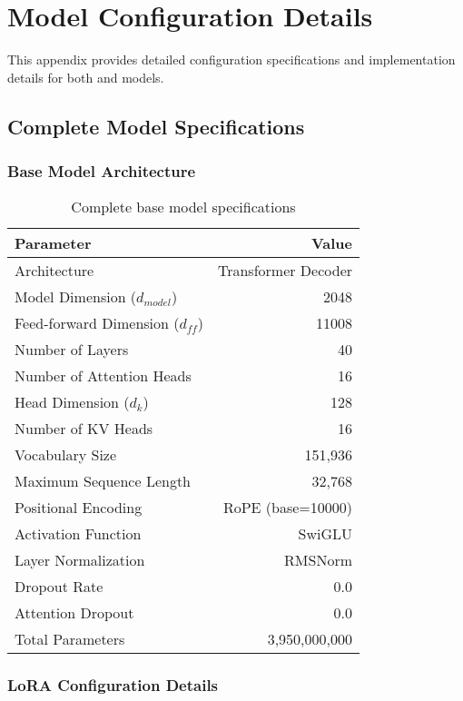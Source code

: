 \section{Model Configuration Details}
\label{appendix:config}

This appendix provides detailed configuration specifications and implementation details for both \supra{} and \zennano{} models.

\subsection{Complete Model Specifications}

\subsubsection{Base Model Architecture}

\begin{table}[H]
\centering
\begin{tabular}{lr}
\toprule
\textbf{Parameter} & \textbf{Value} \\
\midrule
Architecture & Transformer Decoder \\
Model Dimension ($d_{model}$) & 2048 \\
Feed-forward Dimension ($d_{ff}$) & 11008 \\
Number of Layers & 40 \\
Number of Attention Heads & 16 \\
Head Dimension ($d_k$) & 128 \\
Number of KV Heads & 16 \\
Vocabulary Size & 151,936 \\
Maximum Sequence Length & 32,768 \\
Positional Encoding & RoPE (base=10000) \\
Activation Function & SwiGLU \\
Layer Normalization & RMSNorm \\
Dropout Rate & 0.0 \\
Attention Dropout & 0.0 \\
Total Parameters & 3,950,000,000 \\
\bottomrule
\end{tabular}
\caption{Complete base model specifications}
\label{tab:complete-specs}
\end{table}

\subsubsection{LoRA Configuration Details}

